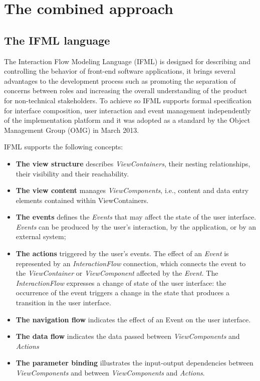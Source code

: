 \chead{}
\chapter{The combined approach}

\section{The IFML language}

The Interaction Flow Modeling Language (IFML)\cite{IFML-1, IFML-2} is designed for describing and controlling the behavior of front-end software applications, it brings several advantages to the development process such as promoting the separation of concerns between roles and increasing the overall understanding of the product for non-technical stakeholders. To achieve so IFML supports formal specification for interface composition, user interaction and event management independently of the implementation platform and it was adopted as a standard by the Object Management Group (OMG) in March 2013.

IFML supports the following concepts: 

\begin{itemize}
  \item \textbf{The view structure} describes \textit{ViewContainers}, their nesting relationships, their visibility and their reachability.
    
  \item \textbf{The view content} manages \textit{ViewComponents}, i.e., content and data entry elements contained within ViewContainers.
  
  \item \textbf{The events} defines the \textit{Events} that may affect the state of the user interface. \textit{Events} can be produced by the user’s interaction, by the application, or by an external system; 

  \item \textbf{The actions} triggered by the user’s events. The effect of an \textit{Event} is represented by an \textit{InteractionFlow} connection, which connects the event to the \textit{ViewContainer} or \textit{ViewComponent} affected by the \textit{Event}. The \textit{InteractionFlow} expresses a change of state of the user interface: the occurrence of the event triggers a change in the state that produces a transition in the user interface.
  
  \item \textbf{The navigation flow} indicates the effect of an Event on the user interface.

  \item \textbf{The data flow} indicates the data passed between \textit{ViewComponents} and \textit{Actions}
  
  \item \textbf{The parameter binding} illustrates the input-output dependencies between \textit{ViewComponents} and between \textit{ViewComponents} and \textit{Actions}. 


\end{itemize} 

